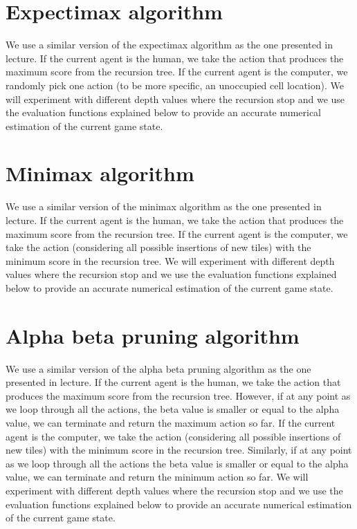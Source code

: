 \documentclass[11pt]{article}
\begin{document}
\section{Expectimax algorithm}

We use a similar version of the expectimax algorithm as the one presented in lecture. If the current agent is the human, we take the action that produces the maximum score from the recursion tree. If the current agent is the computer, we randomly pick one action (to be more specific, an unoccupied cell location). We will experiment with different depth values where the recursion stop and we use the evaluation functions explained below to provide an accurate numerical estimation of the current game state.

\section{Minimax algorithm}

We use a similar version of the minimax algorithm as the one presented in lecture. If the current agent is the human, we take the action that produces the maximum score from the recursion tree. If the current agent is the computer, we take the action (considering all possible insertions of new tiles) with the minimum score in the recursion tree. We will experiment with different depth values where the recursion stop and we use the evaluation functions explained below to provide an accurate numerical estimation of the current game state.

\section{Alpha beta pruning algorithm}

We use a similar version of the alpha beta pruning algorithm as the one presented in lecture. If the current agent is the human, we take the action that produces the maximum score from the recursion tree. However, if at any point as we loop through all the actions, the beta value is smaller or equal to the alpha value, we can terminate and return the maximum action so far. If the current agent is the computer, we take the action (considering all possible insertions of new tiles) with the minimum score in the recursion tree. Similarly, if at any point as we loop through all the actions the beta value is smaller or equal to the alpha value, we can terminate and return the minimum action so far. We will experiment with different depth values where the recursion stop and we use the evaluation functions explained below to provide an accurate numerical estimation of the current game state.
\end{document}
